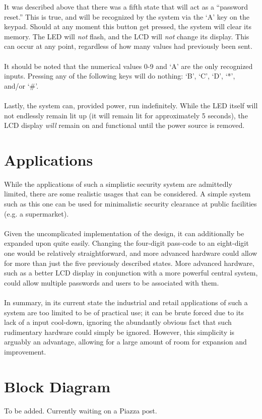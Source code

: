 \documentclass[10pt,a4paper]{article}
\begin{document}
\pagebreak
It was described above that there was a fifth state that will act as a ``password reset.'' This is true, and will be recognized by the system via the `A' key on the keypad. Should at any moment this button get pressed, the system will clear its memory. The LED will \textit{not} flash, and the LCD will \textit{not} change its display. This can occur at any point, regardless of how many values had previously been sent. \\~\\
It should be noted that the numerical values 0-9 and `A' are the only recognized inputs. Pressing any of the following keys will do nothing: `B', `C', `D', `*', and/or `\#'. \\~\\
Lastly, the system can, provided power, run indefinitely. While the LED itself will not endlessly remain lit up (it will remain lit for approximately 5 seconds), the LCD display \textit{will} remain on and functional until the power source is removed.
\pagebreak
\section{Applications}
While the applications of such a simplistic security system are admittedly limited, there are some realistic usages that can be considered. A simple system such as this one can be used for minimalistic security clearance at public facilities (e.g. a supermarket). \\~\\
Given the uncomplicated implementation of the design, it can additionally be expanded upon quite easily. Changing the four-digit pass-code to an eight-digit one would be relatively straightforward, and more advanced hardware could allow for more than just the five previously described states. More advanced hardware, such as a better LCD display in conjunction with a more powerful central system, could allow multiple passwords and users to be associated with them. \\~\\
In summary, in its current state the industrial and retail applications of such a system are too limited to be of practical use; it can be brute forced due to its lack of a input cool-down, ignoring the abundantly obvious fact that such rudimentary hardware could simply be ignored. However, this simplicity is arguably an advantage, allowing for a large amount of room for expansion and improvement.
\pagebreak
\section{Block Diagram}
To be added. Currently waiting on a Piazza post.
\pagebreak
\end{document}
